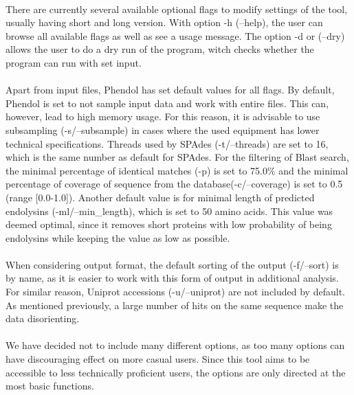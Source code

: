 \paragraph*{} 
There are currently several available optional flags to modify settings of the tool, usually having short and long version. With option -h (--help), the user can browse all available flags as well as see a usage message. The option -d or (--dry) allows the user to do a dry run of the program, witch checks whether the program can run with set input.
\paragraph*{}
Apart from input files, Phendol has set default values for all flags. By default, Phendol is set to not sample input data and work with entire files. This can, however, lead to high memory usage. For this reason, it is advisable to use subsampling (-s/--subsample) in cases where the used equipment has lower technical specifications. Threads used by SPAdes (-t/--threads) are set to 16, which is the same number as default for SPAdes. For the filtering of Blast search, the minimal percentage of identical matches (-p) is set to 75.0\% and the minimal percentage of coverage of sequence from the database(-c/--coverage) is set to 0.5 (range [0.0-1.0]). Another default value is for minimal length of predicted endolysins (-ml/--min\_length), which is set to 50 amino acids. This value was deemed optimal, since it removes short proteins with low probability of being endolysins while keeping the value as low as possible. 
\paragraph*{}
When considering output format, the default sorting of the output (-f/--sort) is by name, as it is easier to work with this form of output in additional analysis. For similar reason, Uniprot accessions (-u/--uniprot) are not included by default. As mentioned previously, a large number of hits on the same sequence make the data disorienting.
\paragraph*{}
We have decided not to include many different options, as too many options can have discouraging effect on more casual users. Since this tool aims to be accessible to less technically proficient users, the options are only directed at the most basic functions.

